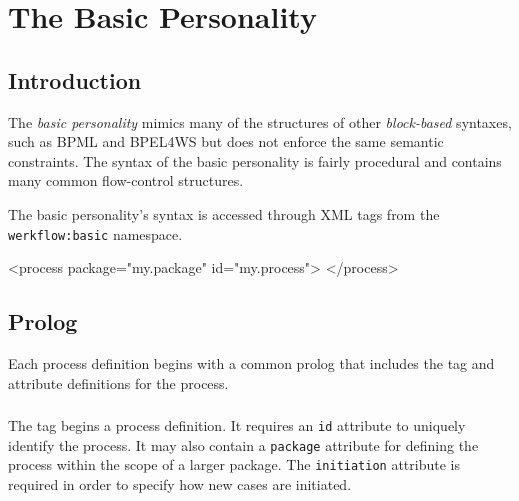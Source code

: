 
\chapter{The Basic Personality}


\section{Introduction}

The \emph{basic personality} mimics many of the structures
of other \emph{block-based} syntaxes, such as BPML and BPEL4WS
but does not enforce the same semantic constraints.  The syntax of
the basic personality is fairly procedural and contains many common
flow-control structures.

The basic personality's syntax is accessed through XML tags from
the \verb|werkflow:basic| namespace.

\begin{codelisting}
<process 
         package="my.package"
         id="my.process">
</process>
\end{codelisting}


\section{Prolog}

Each process definition begins with a common prolog that includes
the  tag and attribute definitions for the process.

\subsection{}

The  tag begins a process definition. It requires an
\verb|id| attribute to uniquely identify the process.  It may also
contain a \verb|package| attribute for defining the process within
the scope of a larger package.  The \verb|initiation| attribute is
required in order to specify how new cases are initiated.

